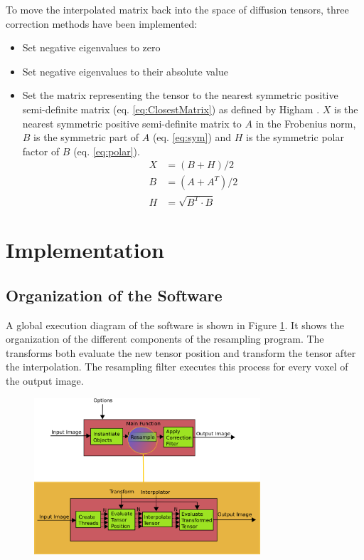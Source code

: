 \documentclass{InsightArticle}
\begin{document}
To move the interpolated matrix back into the space of diffusion tensors, three correction methods have been implemented:
\begin{itemize}
\item Set negative eigenvalues to zero 
\item Set negative eigenvalues to their absolute value 
\item Set the matrix representing the tensor to the nearest symmetric positive semi-definite matrix (eq. \ref{eq:ClosestMatrix}) as defined by Higham \cite{Higham1988}. $X$ is the nearest symmetric positive semi-definite matrix to $A$ in the Frobenius norm, $B$ is the symmetric part of $A$ (eq. \ref{eq:sym}) and $H$ is the symmetric polar factor of $B$ (eq. \ref{eq:polar}).
\begin{align}
\label{eq:ClosestMatrix}
X &= (B + H )/2\\
\label{eq:sym}
B &= (A + A^{T} )/2\\
\label{eq:polar}
H &= \sqrt{ B^{T} \cdot B }
\end{align}

\end{itemize}

\section{Implementation}


\subsection{Organization of the Software}
A global execution diagram of the software is shown in Figure \ref{fig:SoftwareExecutionDiagram}. It shows the organization of the different components of the resampling program. The transforms both evaluate the new tensor position and transform the tensor after the interpolation. The resampling filter executes this process for every voxel of the output image.

\begin{figure}
\center
\includegraphics[width=0.75\textwidth]{Program.png}
\label{fig:SoftwareExecutionDiagram}
\end{figure}
\end{document}
